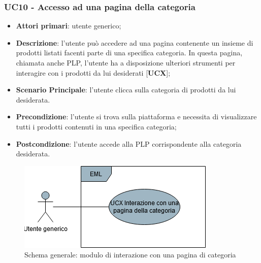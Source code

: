 \subsubsection{UC10 - Accesso ad una pagina della categoria}
\begin{itemize}
\item \textbf{Attori primari}: utente generico;
\item \textbf{Descrizione}: l'utente può accedere ad una pagina contenente un insieme di prodotti listati facenti parte di una specifica categoria. In questa pagina, chiamata anche PLP, l'utente ha a disposizione ulteriori strumenti per interagire con i prodotti da lui desiderati [\textbf{UCX}];
\item \textbf{Scenario Principale}: l'utente clicca sulla categoria di prodotti da lui desiderata.
\item \textbf{Precondizione}: l'utente si trova sulla piattaforma e necessita di visualizzare tutti i prodotti contenuti in una specifica categoria;
\item \textbf{Postcondizione}: l'utente accede alla PLP corrispondente alla categoria desiderata.
\end{itemize}
\begin{figure}[H]
\centering
\includegraphics[scale=0.6]{res/UseCase/Immagini/InterazionePaginaCategoriaGenerale}
\caption{Schema generale: modulo di interazione con una pagina di categoria}
\end{figure}